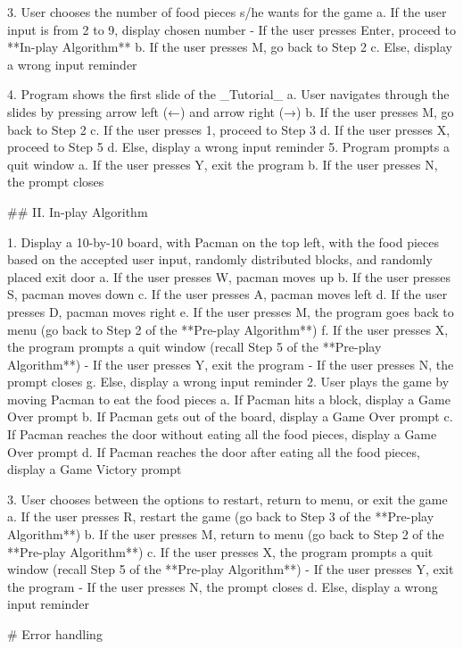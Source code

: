 3. User chooses the number of food pieces s/he wants for the game
   a. If the user input is from 2 to 9, display chosen number - If the user presses Enter, proceed to **In-play Algorithm**
   b. If the user presses M, go back to Step 2
   c. Else, display a wrong input reminder

4. Program shows the first slide of the _Tutorial_
   a. User navigates through the slides by pressing arrow left (←) and arrow right (→)
   b. If the user presses M, go back to Step 2
   c. If the user presses 1, proceed to Step 3
   d. If the user presses X, proceed to Step 5
   d. Else, display a wrong input reminder
5. Program prompts a quit window
   a. If the user presses Y, exit the program
   b. If the user presses N, the prompt closes

## II. In-play Algorithm

1. Display a 10-by-10 board, with Pacman on the top left, with the food pieces based on the accepted user input, randomly distributed blocks, and randomly placed exit door
   a. If the user presses W, pacman moves up
   b. If the user presses S, pacman moves down
   c. If the user presses A, pacman moves left
   d. If the user presses D, pacman moves right
   e. If the user presses M, the program goes back to menu (go back to \*Step 2 of the **Pre-play Algorithm\***)
   f. If the user presses X, the program prompts a quit window (recall \*Step 5 of the **Pre-play Algorithm\***) - If the user presses Y, exit the program - If the user presses N, the prompt closes
   g. Else, display a wrong input reminder
2. User plays the game by moving Pacman to eat the food pieces
   a. If Pacman hits a block, display a Game Over prompt
   b. If Pacman gets out of the board, display a Game Over prompt
   c. If Pacman reaches the door without eating all the food pieces, display a Game Over prompt
   d. If Pacman reaches the door after eating all the food pieces, display a Game Victory prompt

3. User chooses between the options to restart, return to menu, or exit the game
   a. If the user presses R, restart the game (go back to \*Step 3 of the **Pre-play Algorithm\***)
   b. If the user presses M, return to menu (go back to \*Step 2 of the **Pre-play Algorithm\***)
   c. If the user presses X, the program prompts a quit window (recall \*Step 5 of the **Pre-play Algorithm\***) - If the user presses Y, exit the program - If the user presses N, the prompt closes
   d. Else, display a wrong input reminder

# Error handling

